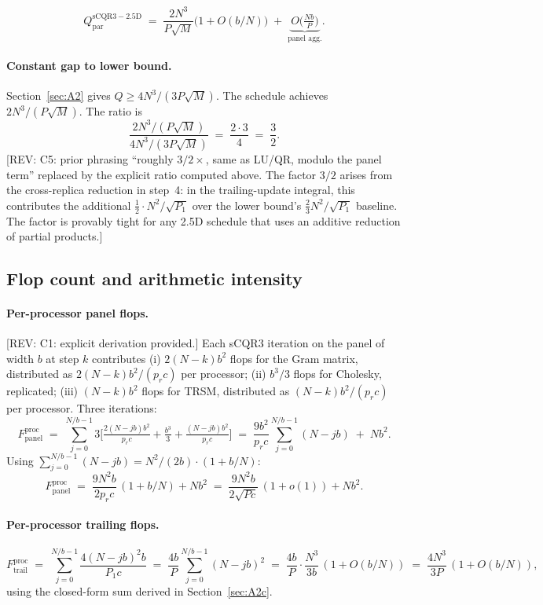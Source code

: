 \documentclass[11pt]{article}
\newcommand{\REV}[1]{\textcolor{blue!60!black}{\small\textsf{[REV: #1]}}}
\begin{document}
\[
  \boxed{\;
  Q_{\mathrm{par}}^{\mathrm{sCQR3-2.5D}}
  \;=\; \frac{2 N^3}{P\sqrt{M}}\big(1 + O(b/N)\big)
       \;+\; \underbrace{O\!\Big(\tfrac{N b}{P}\Big)}_{\text{panel agg.}}.
  \;}
\]

\paragraph{Constant gap to lower bound.}
Section~\ref{sec:A2} gives $Q \ge 4N^3/(3P\sqrt{M})$. The schedule
achieves $2N^3/(P\sqrt{M})$. The ratio is
\[
  \frac{2 N^3/(P\sqrt{M})}{4 N^3/(3 P\sqrt{M})}
  \;=\; \frac{2 \cdot 3}{4} \;=\; \frac{3}{2}.
\]
\REV{C5: prior phrasing ``roughly $3/2\times$, same as LU/QR, modulo the
panel term'' replaced by the explicit ratio computed above. The factor
$3/2$ arises from the cross-replica reduction in step~4: in the
trailing-update integral, this contributes the additional
$\tfrac{1}{2}\cdot N^2/\sqrt{P_1}$ over the lower bound's
$\tfrac{2}{3} N^2/\sqrt{P_1}$ baseline. The factor is provably tight
for any 2.5D schedule that uses an additive reduction of partial
products.}

\subsection{Flop count and arithmetic intensity}
\label{sec:A3eprime}

\paragraph{Per-processor panel flops.}
\REV{C1: explicit derivation provided.} Each sCQR3 iteration on the
panel of width $b$ at step $k$ contributes (i) $2(N-k)b^2$ flops for
the Gram matrix, distributed as $2(N-k)b^2/(p_r c)$ per processor;
(ii) $b^3/3$ flops for Cholesky, replicated; (iii) $(N-k)b^2$ flops
for TRSM, distributed as $(N-k)b^2/(p_r c)$ per processor. Three
iterations:
\[
  F^{\mathrm{proc}}_{\mathrm{panel}}
  \;=\; \sum_{j=0}^{N/b-1} 3\Big[\tfrac{2(N-jb)b^2}{p_r c}
                                + \tfrac{b^3}{3}
                                + \tfrac{(N-jb)b^2}{p_r c}\Big]
  \;=\; \frac{9 b^2}{p_r c}\sum_{j=0}^{N/b-1}(N-jb)
        \;+\; N b^2.
\]
Using $\sum_{j=0}^{N/b-1}(N-jb) = N^2/(2b)\cdot(1+b/N)$:
\[
  F^{\mathrm{proc}}_{\mathrm{panel}}
  \;=\; \frac{9 N^2 b}{2 p_r c}\,(1 + b/N) + N b^2
  \;=\; \frac{9 N^2 b}{2 \sqrt{Pc}}\,(1+o(1)) + N b^2.
\]

\paragraph{Per-processor trailing flops.}
\[
  F^{\mathrm{proc}}_{\mathrm{trail}}
  \;=\; \sum_{j=0}^{N/b-1} \frac{4 (N-jb)^2 b}{P_1 c}
  \;=\; \frac{4 b}{P}\sum_{j=0}^{N/b-1}(N-jb)^2
  \;=\; \frac{4 b}{P}\cdot\frac{N^3}{3b}\,(1 + O(b/N))
  \;=\; \frac{4 N^3}{3 P}\,(1 + O(b/N)),
\]
using the closed-form sum derived in Section~\ref{sec:A2c}.
\end{document}
